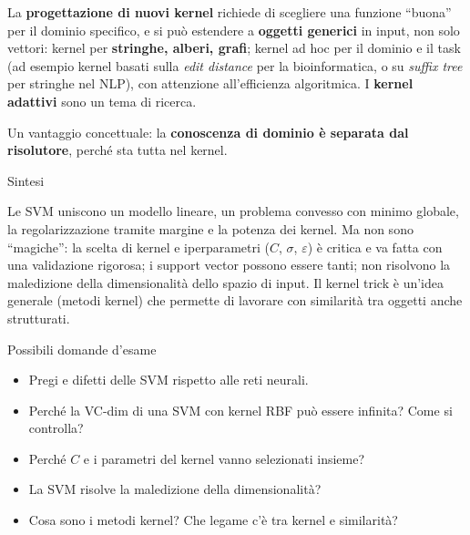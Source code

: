 La \textbf{progettazione di nuovi kernel} richiede di scegliere una
funzione ``buona'' per il dominio specifico, e si può estendere a
\textbf{oggetti generici} in input, non solo vettori: kernel per
\textbf{stringhe, alberi, grafi}; kernel ad hoc per il dominio e il task
(ad esempio kernel basati sulla \emph{edit distance} per la
bioinformatica, o su \emph{suffix tree} per stringhe nel NLP), con
attenzione all'efficienza algoritmica. I \textbf{kernel adattivi} sono
un tema di ricerca.

Un vantaggio concettuale: la \textbf{conoscenza di dominio è separata
dal risolutore}, perché sta tutta nel kernel.

\begin{boxabstract}{Sintesi}

Le SVM uniscono un modello lineare, un problema convesso con minimo
globale, la regolarizzazione tramite margine e la potenza dei kernel. Ma
non sono ``magiche'': la scelta di kernel e iperparametri (\(C\),
\(\sigma\), \(\varepsilon\)) è critica e va fatta con una validazione
rigorosa; i support vector possono essere tanti; non risolvono la
maledizione della dimensionalità dello spazio di input. Il kernel trick
è un'idea generale (metodi kernel) che permette di lavorare con
similarità tra oggetti anche strutturati.

\end{boxabstract}

\begin{boxquestion}{Possibili domande d'esame}

\begin{itemize}
\tightlist
\item
  Pregi e difetti delle SVM rispetto alle reti neurali.
\item
  Perché la VC-dim di una SVM con kernel RBF può essere infinita? Come
  si controlla?
\item
  Perché \(C\) e i parametri del kernel vanno selezionati insieme?
\item
  La SVM risolve la maledizione della dimensionalità?
\item
  Cosa sono i metodi kernel? Che legame c'è tra kernel e similarità?
\end{itemize}

\end{boxquestion}
